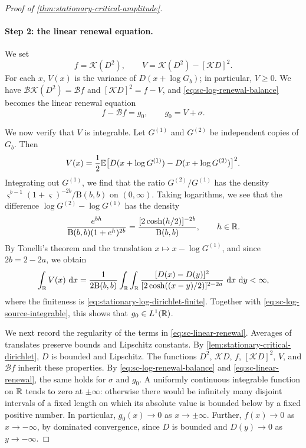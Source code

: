 \begin{proof}[Proof of \cref{thm:stationary-critical-amplitude}]
\paragraph{Step 2: the linear renewal equation.} We set
\[
 f=\mathcal K(D^2),\qquad V=\mathcal K(D^2)-[\mathcal KD]^2 .
\]
For each $x$, $V(x)$ is the variance of $D(x+\log G_b)$; in particular, $V\ge0$. We have $\mathcal B\mathcal K(D^2)=\mathcal Bf$ and $[\mathcal KD]^2=f-V$, and \eqref{eq:sc-log-renewal-balance} becomes the linear renewal equation
\begin{equation}
 f-\mathcal Bf=g_0,\qquad g_0=V+\sigma .
 \label{eq:sc-linear-renewal}
\end{equation}

We now verify that $V$ is integrable. Let $G^{(1)}$ and $G^{(2)}$ be independent copies of $G_b$. Then
\[
 V(x)=\frac12\mathbb E\bigl[D(x+\log G^{(1)})-D(x+\log G^{(2)})\bigr]^2 .
\]
Integrating out $G^{(1)}$, we find that the ratio $G^{(2)}/G^{(1)}$ has the density $\varsigma^{b-1}(1+\varsigma)^{-2b}/\mathrm B(b,b)$ on $(0,\infty)$. Taking logarithms, we see that the difference $\log G^{(2)}-\log G^{(1)}$ has the density
\[
 \frac{e^{bh}}{\mathrm B(b,b)(1+e^h)^{2b}}=\frac{[2\cosh(h/2)]^{-2b}}{\mathrm B(b,b)},\qquad h\in\mathbb R .
\]
By Tonelli's theorem and the translation $x\mapsto x-\log G^{(1)}$, and since $2b=2-2a$, we obtain
\[
 \int_{\mathbb R}V(x)\,\mathop{}\!\mathrm d x
 =\frac1{2\mathrm B(b,b)}\int_{\mathbb R}\int_{\mathbb R}
 \frac{[D(x)-D(y)]^2}{[2\cosh((x-y)/2)]^{2-2a}}
                 \,\mathop{}\!\mathrm d x\,\mathop{}\!\mathrm d y<\infty,
\]
where the finiteness is \eqref{eq:stationary-log-dirichlet-finite}. Together with \eqref{eq:sc-log-source-integrable}, this shows that $g_0\in L^1(\mathbb R)$.

We next record the regularity of the terms in \eqref{eq:sc-linear-renewal}. Averages of translates preserve bounds and Lipschitz constants. By \cref{lem:stationary-critical-dirichlet}, $D$ is bounded and Lipschitz. The functions $D^2$, $\mathcal KD$, $f$, $[\mathcal KD]^2$, $V$, and $\mathcal Bf$ inherit these properties. By \eqref{eq:sc-log-renewal-balance} and \eqref{eq:sc-linear-renewal}, the same holds for $\sigma$ and $g_0$. A uniformly continuous integrable function on $\mathbb R$ tends to zero at $\pm\infty$: otherwise there would be infinitely many disjoint intervals of a fixed length on which its absolute value is bounded below by a fixed positive number. In particular, $g_0(x)\to0$ as $x\to\pm\infty$. Further, $f(x)\to0$ as $x\to-\infty$, by dominated convergence, since $D$ is bounded and $D(y)\to0$ as $y\to-\infty$.


\end{proof}
